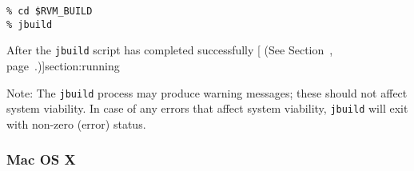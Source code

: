 \begin{enumerate}
\begin{verbatim}
% cd $RVM_BUILD
% jbuild
\end{verbatim}


After the \texttt{jbuild} script has completed successfully [  (See Section~\Ref{}, page~\Pageref{}.)]{section:running}

Note: The \texttt{jbuild} process may produce warning messages; these should not
affect system viability.  In case of any errors that affect system
viability, \texttt{jbuild} will exit with non-zero (error) status.

\end{enumerate}

\subsubsection{Mac OS X}\label{OSX-install}

